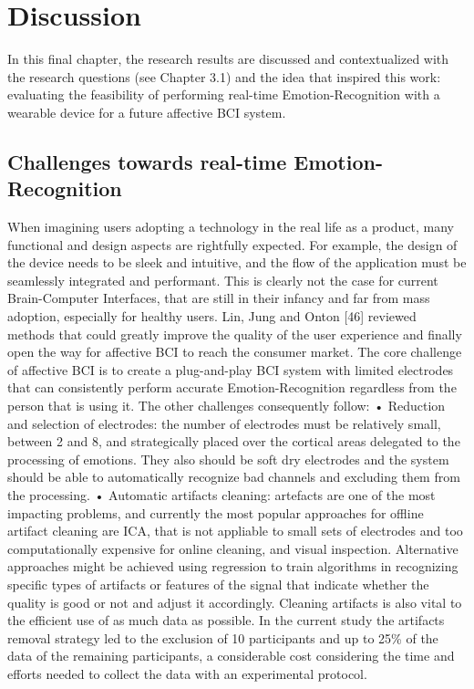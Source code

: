 \chapter{Discussion}
\label{chap:discussion}
In this final chapter, the research results are discussed and contextualized with the research questions (see Chapter 3.1) and the idea that inspired this work: evaluating the feasibility of performing real-time Emotion-Recognition with a wearable device for a future affective BCI system. 

\section{Challenges towards real-time Emotion-Recognition}

When imagining users adopting a technology in the real life as a product, many functional and design aspects are rightfully expected. For example, the design of the device needs to be sleek and intuitive, and the flow of the application must be seamlessly integrated and performant. This is clearly not the case for current Brain-Computer Interfaces, that are still in their infancy and far from mass adoption, especially for healthy users. Lin, Jung and Onton [46] reviewed methods that could greatly improve the quality of the user experience and finally open the way for affective BCI to reach the consumer market. The core challenge of affective BCI is to create a plug-and-play BCI system with limited electrodes that can consistently perform accurate Emotion-Recognition regardless from the person that is using it. The other challenges consequently follow:
•	Reduction and selection of electrodes: the number of electrodes must be relatively small, between 2 and 8, and strategically placed over the cortical areas delegated to the processing of emotions. They also should be soft dry electrodes and the system should be able to automatically recognize bad channels and excluding them from the processing.
•	Automatic artifacts cleaning: artefacts are one of the most impacting problems, and currently the most popular approaches for offline artifact cleaning are ICA, that is not appliable to small sets of electrodes and too computationally expensive for online cleaning, and visual inspection. Alternative approaches might be achieved using regression to train algorithms in recognizing specific types of artifacts or features of the signal that indicate whether the quality is good or not and adjust it accordingly. Cleaning artifacts is also vital to the efficient use of as much data as possible. In the current study the artifacts removal strategy led to the exclusion of 10 participants and up to 25\% of the data of the remaining participants, a considerable cost considering the time and efforts needed to collect the data with an experimental protocol.
